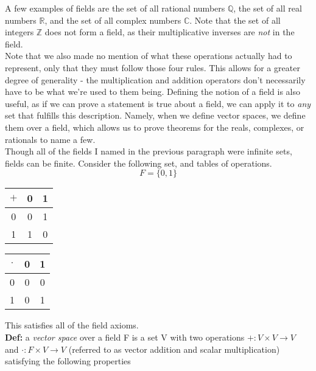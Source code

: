 \documentclass[12pt]{article}
\begin{document}
A few examples of fields are the set of all rational numbers $\mathbb{Q}$, the set of all real numbers $\mathbb{R}$, and the set of all complex numbers $\mathbb{C}$. Note that the set of all integers $\mathbb{Z}$ does not form a field, as their multiplicative inverses are \emph{not} in the field.\\

Note that we also made no mention of what these operations actually had to represent, only that they must follow those four rules. This allows for a greater degree of generality - the multiplication and addition operators don't necessarily have to be what we're used to them being. Defining the notion of a field is also useful, as if we can prove a statement is true about a field, we can apply it to \emph{any} set that fulfills this description. Namely, when we define vector spaces, we define them over a field, which allows us to prove theorems for the reals, complexes, or rationals to name a few. \\

Though all of the fields I named in the previous paragraph were infinite sets, fields can be finite. Consider the following set, and tables of operations.\\

$$F = \{0, 1\}$$

\begin{center}
\begin{tabular}{ c | c c }
$+$ & 0 & 1 \\
\hline
0 & 0 & 1 \\
1 & 1 & 0
\end{tabular}
\qquad \qquad \qquad
\begin{tabular}{ c | c c }
$\cdot$ & 0 & 1 \\
\hline
0 & 0 & 0 \\
1 & 0 & 1
\end{tabular}
\end{center}
This satisfies all of the field axioms.\\

\textbf{Def: }a \emph{vector space} over a field F is a set V with two operations $+:V \times V \rightarrow V$ and $\cdot : F\times V \rightarrow V$ (referred to as vector addition and scalar multiplication) satisfying the following properties
\end{document}
